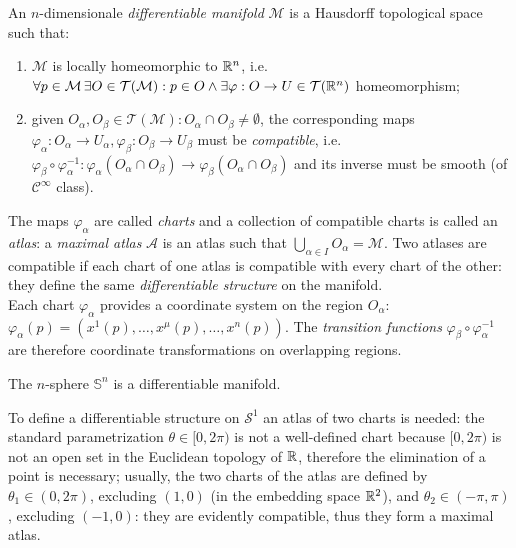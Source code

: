 \begin{definition}
  An $ n $-dimensionale \textit{differentiable manifold} $ \mathcal{M} $ is a Hausdorff topological space such that:
  \begin{enumerate}
    \item $ \mathcal{M} $ is locally homeomorphic to $ \mathbb{R}^n $, i.e. $ \forall p\in\mathcal{M} \, \exists O \in \mathcal{T}(\mathcal{M}) : p \in O \land \exists \varphi : O \rightarrow U \in \mathcal{T}(\mathbb{R}^n) $ homeomorphism;
    \item given $ O_{\alpha},O_{\beta} \in \mathcal{T}(\mathcal{M}) : O_{\alpha} \cap O_{\beta} \neq \emptyset $, the corresponding maps $ \varphi_{\alpha} : O_{\alpha} \rightarrow U_{\alpha}, \varphi_{\beta} : O_{\beta} \rightarrow U_{\beta} $ must be \textit{compatible}, i.e. $ \varphi_{\beta} \circ \varphi_{\alpha}^{-1} : \varphi_{\alpha}(O_{\alpha} \cap O_{\beta}) \rightarrow \varphi_{\beta}(O_{\alpha} \cap O_{\beta}) $ and its inverse must be smooth (of $ \mathcal{C}^{\infty} $ class).
  \end{enumerate}
\end{definition}

The maps $ \varphi_{\alpha} $ are called \textit{charts} and a collection of compatible charts is called an \textit{atlas}: a \textit{maximal atlas} $ \mathcal{A} $ is an atlas such that $ \bigcup_{\alpha \in I} O_{\alpha} = \mathcal{M} $. Two atlases are compatible if each chart of one atlas is compatible with every chart of the other: they define the same \textit{differentiable structure} on the manifold.\\
Each chart $ \varphi_{\alpha} $ provides a coordinate system on the region $ O_{\alpha} $: $ \varphi_{\alpha}(p) = \left( x^1(p), \dots, x^{\mu}(p), \dots, x^n(p) \right) $. The \textit{transition functions} $ \varphi_{\beta} \circ \varphi_{\alpha}^{-1} $ are therefore coordinate transformations on overlapping regions.

\begin{example}
  The $ n $-sphere $ \mathbb{S}^n $ is a differentiable manifold.
\end{example}
\begin{example}
  To define a differentiable structure on $ \mathcal{S}^1 $ an atlas of two charts is needed: the standard parametrization $ \theta \in [0, 2\pi) $ is not a well-defined chart because $ [0,2\pi) $ is not an open set in the Euclidean topology of $ \mathbb{R} $, therefore the elimination of a point is necessary; usually, the two charts of the atlas are defined by $ \theta_1 \in (0,2\pi) $, excluding $ (1,0) $ (in the embedding space $ \mathbb{R}^2 $), and $ \theta_2 \in (-\pi,\pi) $, excluding $ (-1,0) $: they are evidently compatible, thus they form a maximal atlas.
\end{example}

